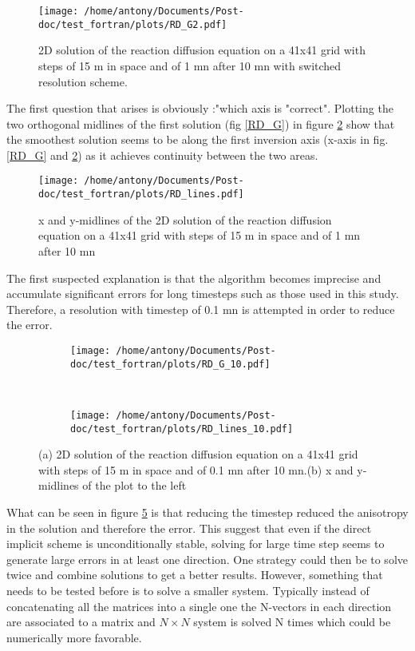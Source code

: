 \documentclass[11pt,a4paper]{article}
\begin{document}
\begin{figure}[ht!]
	\centering
	\texttt{[image: /home/antony/Documents/Post-doc/test\_fortran/plots/RD\_G2.pdf]}
	\caption{2D solution of the reaction diffusion equation on a 41x41 grid with steps of 15 \textmu m in space and of 1 mn after 10 mn with switched resolution scheme.\label{RD_G2}}
\end{figure}

The first question that arises is obviously :"which axis is "correct".  Plotting the two orthogonal midlines of the first solution (fig \ref{RD_G}) in figure \ref{RD_lines} show that the smoothest solution seems to be along the first inversion axis (x-axis in fig. \ref{RD_G} and \ref{RD_lines}) as it achieves continuity between the two areas.

\begin{figure}[ht!]
	\centering
	\texttt{[image: /home/antony/Documents/Post-doc/test\_fortran/plots/RD\_lines.pdf]}
	\caption{x and y-midlines of the 2D solution of the reaction diffusion equation on a 41x41 grid with steps of 15 \textmu m in space and of 1 mn after 10 mn \label{RD_lines}}
\end{figure}

The first suspected explanation is that the algorithm becomes imprecise and accumulate significant errors for long timesteps such as those used in this study. Therefore, a resolution with timestep of 0.1 mn is attempted in order to reduce the error.

\begin{figure}[ht!]
	\begin{subfigure}{0.45\textwidth}
	\centering
	\texttt{[image: /home/antony/Documents/Post-doc/test\_fortran/plots/RD\_G\_10.pdf]}
	\caption{ \label{RD_G_10}}
	\end{subfigure}
	~~
	\begin{subfigure}{0.45\textwidth}
	\texttt{[image: /home/antony/Documents/Post-doc/test\_fortran/plots/RD\_lines\_10.pdf]}
		\caption{ \label{RD_lines_10}}
	\end{subfigure}
	\caption{(a) 2D solution of the reaction diffusion equation on a 41x41 grid with steps of 15 \textmu m in space and of 0.1 mn after 10 mn.(b) x and y-midlines of the plot to the left \label{RD_10}}
\end{figure}

What can be seen in figure \ref{RD_10} is that reducing the timestep reduced the anisotropy in the solution and therefore the error. This suggest that even if the direct implicit scheme is unconditionally stable, solving for large time step seems to generate large errors in at least one direction. One strategy could then be to solve twice and combine solutions to get a better results. However, something that needs to be tested before is to solve a smaller system. Typically instead of concatenating all the matrices into a single one the N-vectors in each direction are associated to a matrix and $N \times N$ system is solved N times which could be numerically more favorable.
\end{document}
